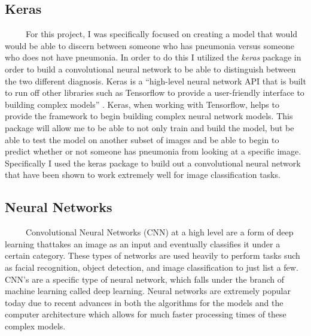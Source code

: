 \documentclass[12pt]{article}
\begin{document}
\hypertarget{keras}{%
\subsection{Keras}\label{keras}}

~~~~~For this project, I was specifically focused on creating a model
that would would be able to discern between someone who has pneumonia
versus someone who does not have pneumonia. In order to do this I
utilized the \emph{keras} package in order to build a convolutional
neural network to be able to distinguish between the two different
diagnosis. Keras is a ``high-level neural network API that is built to
run off other libraries such as Tensorflow to provide a user-friendly
interface to building complex models'' \citet{PML}. Keras, when working
with Tensorflow, helps to provide the framework to begin building
complex neural network models. This package will allow me to be able to
not only train and build the model, but be able to test the model on
another subset of images and be able to begin to predict whether or not
someone has pneumonia from looking at a specific image. Specifically I
used the keras package to build out a convolutional neural network that
have been shown to work extremely well for image classification tasks.

\hypertarget{neural-networks}{%
\subsection{Neural Networks}\label{neural-networks}}

~~~~~Convolutional Neural Networks (CNN) at a high level are a form of
deep learning thattakes an image as an input and eventually classifies
it under a certain category. These types of networks are used heavily to
perform tasks such as facial recognition, object detection, and image
classification to just list a few. CNN's are a specific type of neural
network, which falls under the branch of machine learning called deep
learning. Neural networks are extremely popular today due to recent
advances in both the algorithms for the models and the computer
architecture which allows for much faster processing times of these
complex models.
\end{document}
